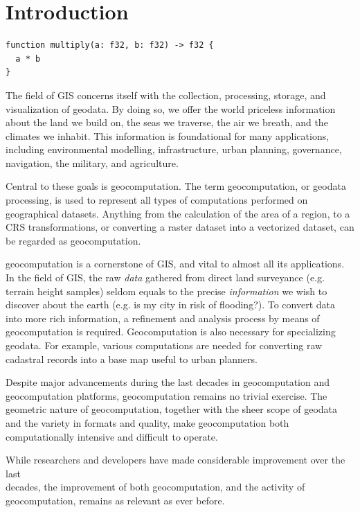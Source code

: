 \chapter{Introduction}
\label{chap:intro}

\begin{lstlisting}
function multiply(a: f32, b: f32) -> f32 {
  a * b
}
\end{lstlisting}

The field of \ac{GIS} concerns itself with the collection, processing, storage, and visualization of geodata. 
By doing so, we offer the world priceless information about the land we build on, the seas we traverse, the air we breath, and the climates we inhabit. 
This information is foundational for many applications, including environmental modelling, infrastructure, urban planning, governance, navigation, the military, and agriculture.   

Central to these goals is \ac{geocomputation}. 
The term geocomputation, or geodata processing, is used to represent all types of computations performed on geographical datasets. Anything from the calculation of the area of a region, to a \ac{CRS} transformations, or converting a raster dataset into a vectorized dataset, can be regarded as geocomputation.

geocomputation is a cornerstone of \ac{GIS}, and vital to almost all its applications.
In the field of GIS, the raw \emph{data} gathered from direct land surveyance (e.g. terrain height samples) seldom equals to the precise \emph{information} we wish to discover about the earth (e.g. is my city in risk of flooding?).
To convert data into more rich information, a refinement and analysis process by means of geocomputation is required. 
Geocomputation is also necessary for specializing geodata. 
For example, various computations are needed for converting raw cadastral records into a base map useful to urban planners.

Despite major advancements during the last decades in geocomputation and geocomputation platforms, geocomputation remains no trivial exercise. 
The geometric nature of geocomputation, together with the sheer scope of geodata and the variety in formats and quality, make geocomputation both computationally intensive and difficult to operate. 

While researchers and developers have made considerable improvement over the last \\ decades, the improvement of both geocomputation, and the activity of geocomputation, remains as relevant as ever before. 

